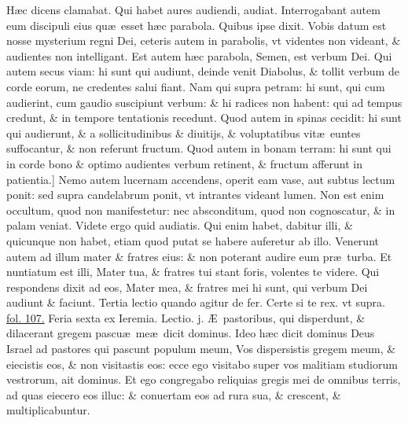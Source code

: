 \documentclass[a5paper,10pt]{book}
\def\leftmarginnote{%
	\lrmarginnote{\hskip -\marginparsep \hskip -6.5em}}
\def\rightmarginnote{%
	\lrmarginnote{\hskip\columnwidth \hskip -1em}}
\def\ae{æ}
\def\AE{Æ}
\begin{document}
\begin{multicols*}{2}
H\ae c dicens clamabat. Qui habet aures audiendi, audiat.
Interrogabant autem eum discipuli eius qu\ae \ esset h\ae c parabola.
Quibus ipse dixit. Vobis datum est nosse mysterium regni Dei, ceteris autem in parabolis, vt videntes non videant, \& audientes non intelligant.
Est autem h\ae c parabola, Semen, est verbum Dei.
Qui autem secus viam: hi sunt qui audiunt, deinde venit Diabolus, \& tollit verbum de corde eorum, ne credentes salui fiant.
Nam qui supra petram: hi sunt, qui cum audierint, cum gaudio suscipiunt verbum: \& hi radices non habent: qui ad tempus credunt, \& in tempore tentationis recedunt.
Quod autem in spinas cecidit: hi sunt qui audierunt, \& a sollicitudinibus \& diuitijs, \& voluptatibus vit\ae \ euntes suffocantur, \& non referunt fructum.
Quod autem in bonam terram: hi sunt qui in corde bono \& optimo audientes verbum retinent, \& fructum afferunt in patientia.]
Nemo\rightmarginnote{C} autem lucernam accendens, operit eam vase, aut subtus lectum ponit: sed supra candelabrum ponit, vt intrantes videant lumen.
Non est enim occultum, quod non manifestetur: nec absconditum, quod non cognoscatur, \& in palam veniat.
Videte ergo quid audiatis. Qui enim
habet, dabitur illi, \& quicunque non habet, etiam quod putat se habere auferetur ab illo.
Venerunt autem ad illum mater \& fratres eius: \& non poterant audire eum pr\ae \ turba.
Et nuntiatum est illi, Mater tua, \& fratres tui stant foris, volentes te videre.
Qui respondens dixit ad eos, Mater mea, \& fratres mei hi sunt, qui verbum Dei audiunt \& faciunt.
\newline \color{red} Tertia lectio quando agitur de fer. \color{black} Certe si te rex. \color{red} vt supra. \color{black} \hyperlink{page.107}{fol. 107.}
\newline {} \color{red} \hypertarget{FRI-TERTIA-ADV}{Feria sexta} ex Ieremia. \hfill Lectio. j. \color{black}
\vspace{-.25em}
\AE \ pastoribus,\leftmarginnote{\begin{flushright}c. 23.\end{flushright}} qui disperdunt, \& dilacerant gregem pascu\ae \ me\ae \ dicit dominus.
Ideo h\ae c dicit dominus Deus Israel ad pastores qui pascunt populum meum, Vos dispersistis gregem meum, \& eiecistis eos, \& non visitastis eos: ecce ego visitabo super vos malitiam studiorum vestrorum, ait dominus.
Et ego congregabo reliquias gregis mei de omnibus terris, ad quas eiecero eos illuc: \& conuertam eos ad rura sua, \& crescent, \& multiplicabuntur.

\end{multicols*}
\end{document}
